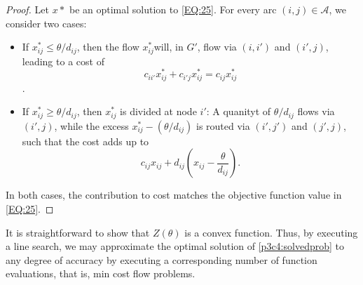 \begin{proof}
Let $x*$ be an optimal solution to \eqref{EQ:25}. For every arc $(i,j)\in \mathcal{A}$, we consider two cases:
\begin{itemize}
	\item If $x^*_{ij}\leq\theta/d_{ij}$, then the flow $x^*_{ij}$will, in $G'$, flow via $(i,i')$ and $(i',j)$, leading to a cost of \[c_{ii'}x^*_{ij}+c_{i'j}x^*_{ij} = c_{ij}x^*_{ij}\].
	\item If $x^*_{ij}\geq\theta/d_{ij}$, then $x^*_{ij}$ is divided at node $i'$: A quanityt of $\theta/d_{ij}$ flows via $(i',j)$, while the excess $x^*_{ij}-(\theta/d_{ij})$ is routed via $(i',j')$ and $(j',j)$, such that the cost adds up to \[c_{ij}x_{ij}+d_{ij}\left(x_{ij}-\frac{\theta}{d_{ij}}\right).\]
\end{itemize}
In both cases, the contribution to cost matches the objective function value in \eqref{EQ:25}.
\end{proof}

It is straightforward to show that $Z(\theta)$ is a convex function. Thus, by executing a line search, we may approximate the optimal solution of \eqref{p3c4:solvedprob} to any degree of accuracy by executing a corresponding number of function evaluations, that is, min cost flow problems.